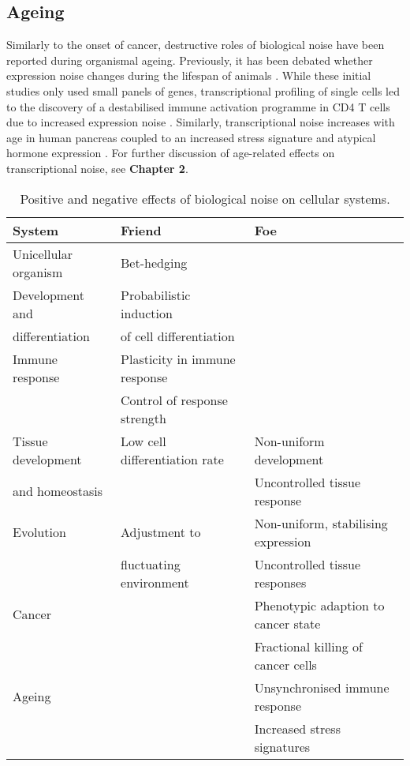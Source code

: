 \newpage

\subsection{Ageing}

Similarly to the onset of cancer, destructive roles of biological noise have been reported during organismal ageing. Previously, it has been debated whether expression noise changes during the lifespan of animals \cite{Bahar2006, Warren2007}. 
While these initial studies only used small panels of genes, transcriptional profiling of single cells led to the discovery of a destabilised immune activation programme in CD4\plus{} T cells due to increased expression noise \cite{Martinez-jimenez2017}. 
Similarly, transcriptional noise increases with age in human pancreas coupled to an increased stress signature and atypical hormone expression \citep{Enge2017}. 
For further discussion of age-related effects on transcriptional noise, see \textbf{Chapter 2}. \\


\begin{table}[hb	]
\centering
\caption{Positive and negative effects of biological noise on cellular systems.}
\label{table:effects_noise}
\begin{tabular}{l l l}
\toprule
\toprule
\textbf{System} & \textbf{Friend} & \textbf{Foe} \\ 
\midrule
\midrule
Unicellular organism & Bet-hedging & \\
\midrule
Development and & Probabilistic induction  & \\
differentiation & of cell differentiation & \\
\midrule
Immune response & Plasticity in immune response & \\
 & Control of response strength &   \\
\midrule
Tissue development  & Low cell differentiation rate & Non-uniform development \\ 
and homeostasis &  & Uncontrolled tissue response \\
\midrule
Evolution & Adjustment to  & Non-uniform, stabilising expression \\ 
& fluctuating environment & Uncontrolled tissue responses \\
\midrule
Cancer &  & Phenotypic adaption to cancer state \\
& & Fractional killing of cancer cells \\
\midrule
Ageing &  & Unsynchronised immune response \\
& & Increased stress signatures \\ 
\bottomrule
\bottomrule
\end{tabular}
\end{table}
